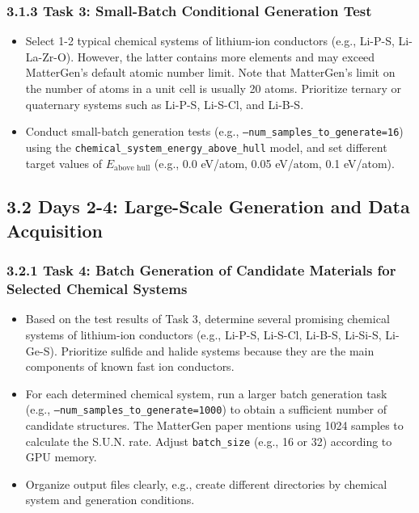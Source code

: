 \documentclass[letterpaper]{article} %
\begin{document}
\subsubsection{3.1.3 Task 3: Small-Batch Conditional Generation Test}
\begin{itemize}
    \item Select 1-2 typical chemical systems of lithium-ion conductors (e.g., Li-P-S, Li-La-Zr-O). However, the latter contains more elements and may exceed MatterGen's default atomic number limit. Note that MatterGen's limit on the number of atoms in a unit cell is usually 20 atoms. Prioritize ternary or quaternary systems such as Li-P-S, Li-S-Cl, and Li-B-S.
    \item Conduct small-batch generation tests (e.g., \texttt{--num\_samples\_to\_generate=16}) using the \texttt{chemical\_system\_energy\_above\_hull} model, and set different target values of $E_{\text{above hull}}$ (e.g., 0.0 eV/atom, 0.05 eV/atom, 0.1 eV/atom).
\end{itemize}

\subsection{3.2 Days 2-4: Large-Scale Generation and Data Acquisition}

\subsubsection{3.2.1 Task 4: Batch Generation of Candidate Materials for Selected Chemical Systems}
\begin{itemize}
    \item Based on the test results of Task 3, determine several promising chemical systems of lithium-ion conductors (e.g., Li-P-S, Li-S-Cl, Li-B-S, Li-Si-S, Li-Ge-S). Prioritize sulfide and halide systems because they are the main components of known fast ion conductors.
    \item For each determined chemical system, run a larger batch generation task (e.g., \texttt{--num\_samples\_to\_generate=1000}) to obtain a sufficient number of candidate structures. The MatterGen paper mentions using 1024 samples to calculate the S.U.N. rate. Adjust \texttt{batch\_size} (e.g., 16 or 32) according to GPU memory.
    \item Organize output files clearly, e.g., create different directories by chemical system and generation conditions.
\end{itemize}
\end{document}
